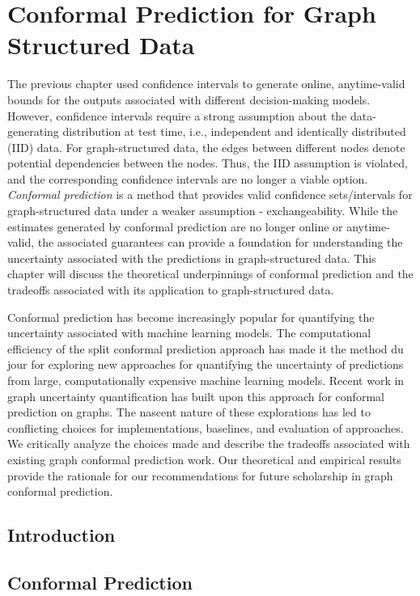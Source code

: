 \chapter{Conformal Prediction for Graph Structured Data}
\label{chp:graphConformal}
The previous chapter used confidence intervals to generate online, anytime-valid bounds for the outputs associated with different decision-making models.
However, confidence intervals require a strong assumption about the data-generating distribution at test time, i.e., independent and identically distributed (IID) data.
For graph-structured data, the edges between different nodes denote potential dependencies between the nodes.
Thus, the IID assumption is violated, and the corresponding confidence intervals are no longer a viable option.
\emph{Conformal prediction} is a method that provides valid confidence sets/intervals for graph-structured data under a weaker assumption - exchangeability.
While the estimates generated by conformal prediction are no longer online or anytime-valid, the associated guarantees can provide a foundation for understanding the uncertainty associated with the predictions in graph-structured data.
This chapter will discuss the theoretical underpinnings of conformal prediction and the tradeoffs associated with its application to graph-structured data.

Conformal prediction has become increasingly popular for quantifying the uncertainty associated with machine learning models. 
The computational efficiency of the split conformal prediction approach has made it the method du jour for exploring new approaches for quantifying the uncertainty of predictions from large, computationally expensive machine learning models.
Recent work in graph uncertainty quantification has built upon this approach for conformal prediction on graphs.
The nascent nature of these explorations has led to conflicting choices for implementations, baselines, and evaluation of approaches.
We critically analyze the choices made and describe the tradeoffs associated with existing graph conformal prediction work. 
Our theoretical and empirical results provide the rationale for our recommendations for future scholarship in graph conformal prediction.

\section{Introduction}


\section{Conformal Prediction}



